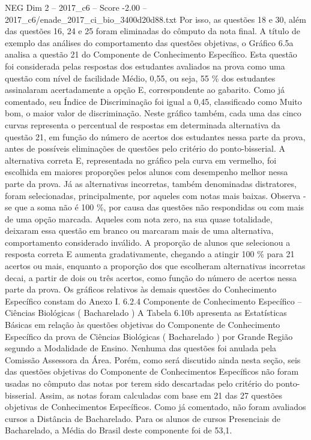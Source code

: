 \begin{textsample}{NEG Dim 2 – 2017\_c6 – Score -2.00 – 2017\_c6/enade\_2017\_ci\_bio\_3400d20d88.txt}
Por isso, as questões 18 e 30, além das questões 16, 24 e 25 foram eliminadas do cômputo da nota final.
A título de exemplo das análises do comportamento das questões objetivas, o Gráfico 6.5a analisa a questão 21 do Componente de Conhecimento Específico.
Esta questão foi considerada pelas respostas dos estudantes avaliados na prova como uma questão com nível de facilidade Médio, 0,55, ou seja, 55 \% dos estudantes assinalaram acertadamente a opção E, correspondente ao gabarito.
Como já comentado, seu Índice de Discriminação foi igual a 0,45, classificado como Muito bom, o maior valor de discriminação.
Neste gráfico também, cada uma das cinco curvas representa o percentual de respostas em determinada alternativa da questão 21, em função do número de acertos dos estudantes nessa parte da prova, antes de possíveis eliminações de questões pelo critério do ponto-bisserial.
A alternativa correta E, representada no gráfico pela curva em vermelho, foi escolhida em maiores proporções pelos alunos com desempenho melhor nessa parte da prova.
Já as alternativas incorretas, também denominadas distratores, foram selecionadas, principalmente, por aqueles com notas mais baixas.
Observa -se que a soma não é 100 \%, por causa das questões não respondidas ou com mais de uma opção marcada.
Aqueles com nota zero, na sua quase totalidade, deixaram essa questão em branco ou marcaram mais de uma alternativa, comportamento considerado inválido.
A proporção de alunos que selecionou a resposta correta E aumenta gradativamente, chegando a atingir 100 \% para 21 acertos ou mais, enquanto a proporção dos que escolheram alternativas incorretas decai, a partir de dois ou três acertos, como função do número de acertos nessa parte da prova.
Os gráficos relativos às demais questões do Conhecimento Específico constam do Anexo I. 6.2.4 Componente de Conhecimento Específico – Ciências Biológicas ( Bacharelado ) A Tabela 6.10b apresenta as Estatísticas Básicas em relação às questões objetivas do Componente de Conhecimento Específico da prova de Ciências Biológicas ( Bacharelado ) por Grande Região segundo a Modalidade de Ensino.
Nenhuma das questões foi anulada pela Comissão Assessora da Área.
Porém, como será discutido ainda nesta seção, seis das questões objetivas do Componente de Conhecimentos Específicos não foram usadas no cômputo das notas por terem sido descartadas pelo critério do ponto-bisserial.
Assim, as notas foram calculadas com base em 21 das 27 questões objetivas de Conhecimentos Específicos.
Como já comentado, não foram avaliados cursos a Distância de Bacharelado.
Para os alunos de cursos Presenciais de Bacharelado, a Média do Brasil deste componente foi de 53,1.

\end{textsample}
